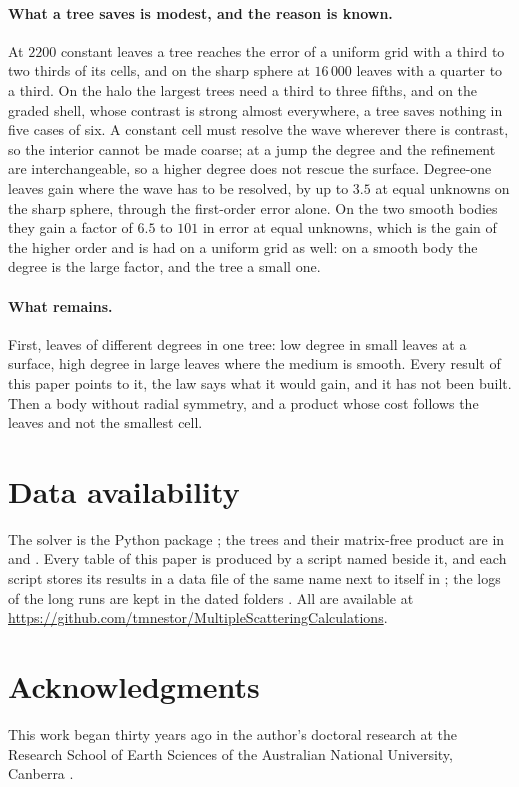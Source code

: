 \documentclass[11pt,a4paper]{article}
\begin{document}
\paragraph{What a tree saves is modest, and the reason is known.} At $2200$ constant leaves a tree
reaches the error of a uniform grid with a third to two thirds of its cells, and on the sharp sphere at
$16\,000$ leaves with a quarter to a third. On the halo the largest trees need a third to three fifths,
and on the graded shell, whose contrast is strong almost everywhere, a tree saves nothing in five cases
of six. A constant cell must resolve the wave wherever there is
contrast, so the interior cannot be made coarse; at a jump the degree and the refinement are
interchangeable, so a higher degree does not rescue the surface. Degree-one leaves gain where the wave
has to be resolved, by up to $3.5$ at equal unknowns on the sharp sphere, through the first-order error
alone. On the two smooth bodies they gain a factor of $6.5$ to $101$ in error at equal unknowns, which is
the gain of the higher order and is had on a uniform grid as well: on a smooth body the degree is the
large factor, and the tree a small one.

\paragraph{What remains.} First, leaves of different degrees in one tree: low degree in small leaves at
a surface, high degree in large leaves where the medium is smooth. Every result of this paper points to
it, the law says what it would gain, and it has not been built. Then a body without radial symmetry, and
a product whose cost follows the leaves and not the smallest cell.

\section*{Data availability}
The solver is the Python package ; the trees and their matrix-free product are in
 and .
Every table of this paper is produced by a script named beside it, and each script stores its results in
a data file of the same name next to itself in ; the logs of the long runs are kept in the
dated folders . All are available at
\url{https://github.com/tmnestor/MultipleScatteringCalculations}.

\section*{Acknowledgments}
This work began thirty years ago in the author's doctoral research at the Research School of Earth
Sciences of the Australian National University, Canberra \citep{Nestor1996}.
\end{document}
